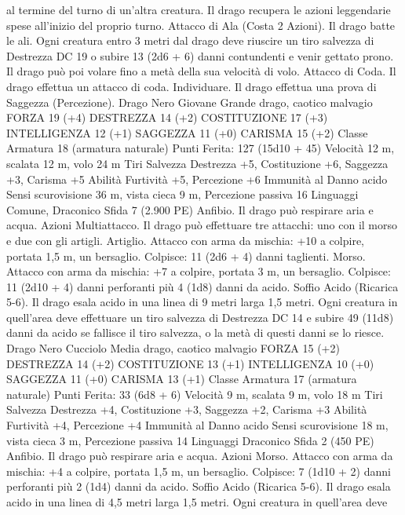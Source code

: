 \begin{multicols}{2}
al termine del turno di un’altra creatura. Il drago recupera le
azioni leggendarie spese all’inizio del proprio turno.
Attacco di Ala (Costa 2 Azioni). Il drago batte le ali. Ogni
creatura entro 3 metri dal drago deve riuscire un tiro salvezza di
Destrezza DC 19 o subire 13 (2d6 + 6) danni contundenti e venir
gettato prono. Il drago può poi volare fino a metà della sua
velocità di volo.
Attacco di Coda. Il drago effettua un attacco di coda.
Individuare. Il drago effettua una prova di Saggezza
(Percezione).
Drago Nero Giovane
Grande drago, caotico malvagio
FORZA 19 (+4)
DESTREZZA 14 (+2)
COSTITUZIONE 17 (+3)
INTELLIGENZA 12 (+1)
SAGGEZZA 11 (+0)
CARISMA 15 (+2)
Classe Armatura 18 (armatura naturale)
\hspace*{0pt}\hfill{Punti Ferita}: 127 (15d10 + 45)
Velocità 12 m, scalata 12 m, volo 24 m
Tiri Salvezza Destrezza +5, Costituzione +6, Saggezza +3,
Carisma +5
Abilità Furtività +5, Percezione +6
Immunità al Danno acido
Sensi scurovisione 36 m, vista cieca 9 m, Percezione passiva 16
Linguaggi Comune, Draconico
Sfida 7 (2.900 PE)
Anfibio. Il drago può respirare aria e acqua.
Azioni
Multiattacco. Il drago può effettuare tre attacchi: uno con il
morso e due con gli artigli.
Artiglio. Attacco con arma da mischia: +10 a colpire, portata 1,5
m, un bersaglio.
Colpisce: 11 (2d6 + 4) danni taglienti.
Morso. Attacco con arma da mischia: +7 a colpire, portata 3 m,
un bersaglio.
Colpisce: 11 (2d10 + 4) danni perforanti più 4 (1d8) danni da acido.
Soffio Acido (Ricarica 5-6). Il drago esala acido in una linea di 9
metri larga 1,5 metri. Ogni creatura in quell’area deve effettuare un tiro
salvezza di Destrezza DC 14 e subire 49 (11d8) danni da acido se fallisce
il tiro salvezza, o la metà di questi danni se lo riesce.
Drago Nero Cucciolo
Media drago, caotico malvagio
FORZA 15 (+2)
DESTREZZA 14 (+2)
COSTITUZIONE 13 (+1)
INTELLIGENZA 10 (+0)
SAGGEZZA 11 (+0)
CARISMA 13 (+1)
Classe Armatura 17 (armatura naturale)
\hspace*{0pt}\hfill{Punti Ferita}: 33 (6d8 + 6)
Velocità 9 m, scalata 9 m, volo 18 m
Tiri Salvezza Destrezza +4, Costituzione +3, Saggezza +2,
Carisma +3
Abilità Furtività +4, Percezione +4
Immunità al Danno acido
Sensi scurovisione 18 m, vista cieca 3 m, Percezione passiva 14
Linguaggi Draconico
Sfida 2 (450 PE)
Anfibio. Il drago può respirare aria e acqua.
Azioni
Morso. Attacco con arma da mischia: +4 a colpire, portata 1,5
m, un bersaglio.
Colpisce: 7 (1d10 + 2) danni perforanti più 2 (1d4) danni da acido.
Soffio Acido (Ricarica 5-6). Il drago esala acido in una linea di
4,5 metri larga 1,5 metri. Ogni creatura in quell’area deve

\end{multicols}

